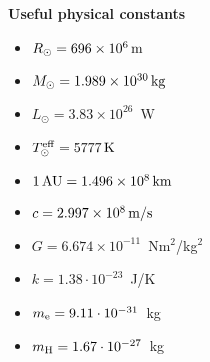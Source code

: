 \documentclass[12pt]{article}
\newcommand{\blue}[1]{\textcolor{blue}{#1}}
\newcommand{\rrr}{\bm{r}}
\newcommand{\uuu}{\bm{u}}
\def\pd{\partial}
\begin{document}


{\bf Useful physical constants}
\begin{itemize}
  \item $R_{\odot} = 696 \times 10^6\,{\rm m}$
  \item $M_{\odot} = 1.989 \times 10^{30}\,{\rm kg}$
  \item $L_{\odot} = 3.83 \times 10^{26}$~W
  \item $T^{\rm eff}_{\odot} = 5777\,{\rm K}$
  \item $1\,{\rm AU} = 1.496 \times 10^8\,{\rm km}$
  \item $c = 2.997 \times 10^8\,{\rm m/s}$
  \item $G = 6.674 \times 10^{-11}$~Nm$^2$/kg$^2$
  \item $k = 1.38\cdot10^{-23}$~J/K
  \item $m_{\rm e} = 9.11\cdot10^{-31}$~kg
  \item $m_{\rm H} = 1.67\cdot10^{-27}$~kg
\end{itemize}
\end{document}
